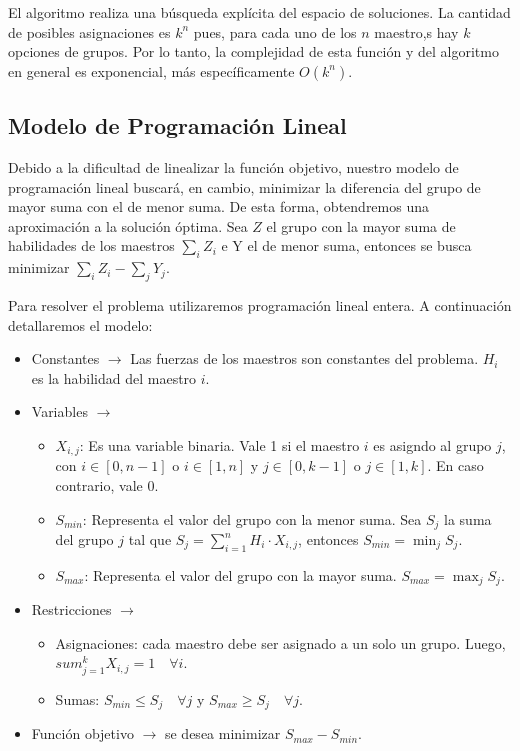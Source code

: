 \documentclass{article}
\begin{document}
El algoritmo realiza una búsqueda explícita del espacio de soluciones. La cantidad de posibles asignaciones es $k^n$ pues, para cada uno de los $n$ maestro,s hay $k$ opciones de grupos. Por lo tanto, la complejidad de esta función y del algoritmo en general es exponencial, más específicamente $O(k^n)$.

\subsection{Modelo de Programación Lineal}

Debido a la dificultad de linealizar la función objetivo, nuestro modelo de programación lineal buscará, en cambio, minimizar la diferencia del grupo de mayor suma con el de menor suma. De esta forma, obtendremos una aproximación a la solución óptima. Sea $Z$ el grupo con la mayor suma de habilidades de los maestros \(\sum_{i} Z_i\) e Y el de menor suma, entonces se busca minimizar \(\sum_{i} Z_i - \sum_{j} Y_j\).

Para resolver el problema utilizaremos programación lineal entera. A continuación detallaremos el modelo:
\begin{itemize}
    \item Constantes $\rightarrow$ Las fuerzas de los maestros son constantes del problema. $H_i$ es la habilidad del maestro $i$.
    \item Variables $\rightarrow$
    \begin{itemize}
        \item $X_{i,j}$: Es una variable binaria. Vale 1 si el maestro $i$ es asigndo al grupo $j$, con $i \in [0, n-1]$ o $i \in [1, n]$ y $ j \in [0, k-1]$ o $j \in [1, k]$. En caso contrario, vale 0.
        \item $S_{min}$: Representa el valor del grupo con la menor suma. Sea $S_j$ la suma del grupo $j$ tal que $S_j = \sum_{i=1}^{n} H_i \cdot X_{i,j} $, entonces $S_{min} = \min_j S_j$. 
        \item $S_{max}$: Representa el valor del grupo con la mayor suma. $S_{max} = \max_j S_j$.
    \end{itemize}
    \item Restricciones $\rightarrow$
    \begin{itemize}
        \item Asignaciones: cada maestro debe ser asignado a un solo un grupo. Luego, $sum_{j=1}^{k} X_{i,j} = 1 \quad \forall i$.
        \item Sumas: $S_{min} \leq S_j \quad \forall j$ y $S_{max} \geq S_j \quad \forall j$.
    \end{itemize}
    \item Función objetivo $\rightarrow$ se desea minimizar $S_{max} - S_{min}$.
\end{itemize}
\end{document}

